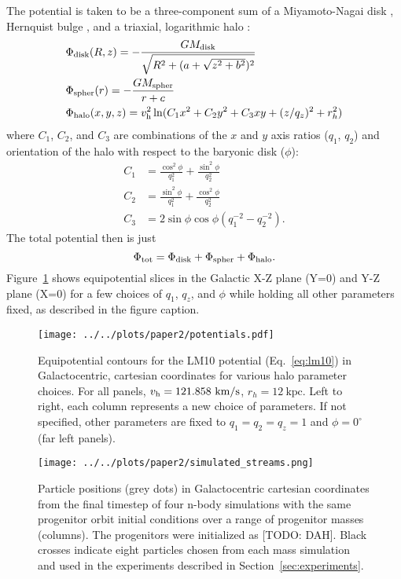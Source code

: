 \documentclass[letterpaper,12pt,preprint]{aastex}
\newcommand{\vhalo}{v_{\rm h}}
\begin{document}
The potential is taken to be a three-component sum of a Miyamoto-Nagai disk \citep{}, Hernquist bulge \citep[spheroid;][]{}, and a triaxial, logarithmic halo \citep[e.g.,][]{law10}:
\begin{align}
	&\Phi_{\rm disk}(R,z) = -\frac{GM_{\rm disk}}{\sqrt{R^2 + (a + \sqrt{z^2 + b^2})^2}}\\
	&\Phi_{\rm spher}(r) = -\frac{GM_{\rm spher}}{r + c}\\
	&\Phi_{\rm halo}(x,y,z) = \vhalo^2 \ln(C_1 x^2 + C_2 y^2 + C_3 xy + (z/q_z)^2 + r_h^2)
\end{align}
where $C_1$, $C_2$, and $C_3$ are combinations of the $x$ and $y$ axis
ratios ($q_1$, $q_2$) and orientation of the halo with respect to the
baryonic disk ($\phi$):
\begin{align}
  C_1 &= \frac{\cos^2\phi}{q_1^2} + \frac{\sin^2\phi}{q_2^2}\\
  C_2 &= \frac{\sin^2\phi}{q_1^2} + \frac{\cos^2\phi}{q_2^2}\\
  C_3 &= 2\sin\phi\cos\phi \left(q_1^{-2} - q_2^{-2}\right).
\end{align}
The total potential then is just
\begin{equation}
	\Phi_{\rm tot} = \Phi_{\rm disk} + \Phi_{\rm spher} + \Phi_{\rm halo}\label{eq:lm10}.
\end{equation}
Figure~\ref{fig:potential} shows equipotential slices in the Galactic X-Z plane (Y=0) and Y-Z plane (X=0) for a few choices of  $q_1$,  $q_z$, and $\phi$ while holding all other parameters fixed, as described in the figure caption.

\begin{figure}[h]
\begin{center}
\texttt{[image: ../../plots/paper2/potentials.pdf]}
\caption{ Equipotential contours for the LM10 potential (Eq.~\ref{eq:lm10}) in Galactocentric, cartesian coordinates for various halo parameter choices. For all panels, $\vhalo=121.858~\mathrm{km}/\mathrm{s}$, $r_h=12~\mathrm{kpc}$. Left to right, each column represents a new choice of parameters. If not specified, other parameters are fixed to $q_1=q_2=q_z=1$ and $\phi=0^\circ$ (far left panels).  }\label{fig:potential}
\end{center}
\end{figure}

\begin{figure}[h]
\begin{center}
\texttt{[image: ../../plots/paper2/simulated\_streams.png]}
\caption{ Particle positions (grey dots) in Galactocentric cartesian coordinates from the final timestep of four n-body simulations with the same progenitor orbit initial conditions over a range of progenitor masses (columns). The progenitors were initialized as [TODO: DAH]. Black crosses indicate eight particles chosen from each mass simulation and used in the experiments described in Section~\ref{sec:experiments}.}\label{fig:sims}
\end{center}
\end{figure}
\end{document}
